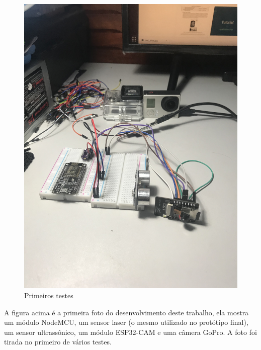 \documentclass[
	12pt,				%
	openright,			%
	oneside,			%
	a4paper,			%
	chapter=TITLE,		%
	english,			%
	brazil				%
	]{abntex2}
\begin{document}
\begin{figure}[H]
    \centering
    \includegraphics[scale=0.09, angle=-90]{imagens/IMG_8989.jpg}
    \caption{Primeiros testes}
        \label{fig:aprincipio}
    \end{figure}

A figura acima é a primeira foto do desenvolvimento deste trabalho, ela mostra um módulo NodeMCU, um sensor laser (o mesmo utilizado no protótipo final), 
um sensor ultrassônico, um módulo ESP32-CAM e uma câmera GoPro. A foto foi tirada no primeiro de vários testes. 
\end{document}
